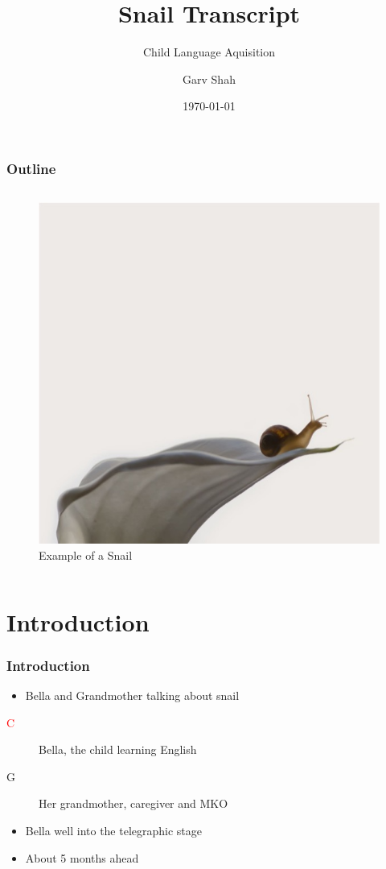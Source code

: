 \documentclass[compress]{beamer}
\title{Snail Transcript}
\subtitle{Child Language Aquisition}
\author{Garv Shah}
\institute{English Language}
\date{\today}
\begin{document}
\begin{frame}
\titlepage
\end{frame}

\begin{frame}
\frametitle{Outline}

\begin{columns}
	\tableofcontents

	\centering
	\begin{figure}
		\includegraphics[scale=0.3]{snail.jpg}
		\caption{Example of a Snail}
	\end{figure}
\end{columns}

\end{frame}

\section{Introduction}
\begin{frame}
	\frametitle{Introduction}

	\begin{itemize}
		\item Bella and Grandmother talking about snail
	\end{itemize}

	\begin{description}
		\item[\textcolor{red}{C}] Bella, the child learning English
		\item[G] Her grandmother, caregiver and MKO
	\end{description}

	\begin{itemize}
		\item Bella well into the telegraphic stage
		\item About 5 months ahead
	\end{itemize}
\end{frame}
\end{document}
